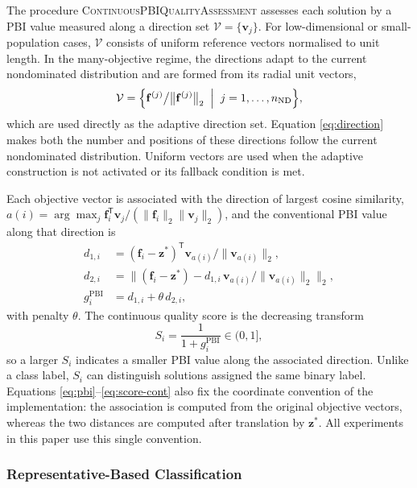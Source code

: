 \documentclass[final,5p,times,twocolumn]{elsarticle}
\newcommand{\vf}{\mathbf{f}}
\newcommand{\vv}{\mathbf{v}}
\newcommand{\vz}{\mathbf{z}}
\begin{document}
The procedure \textsc{ContinuousPBIQualityAssessment} assesses each solution
by a PBI value measured along a
direction set $\mathcal{V}=\{\vv_j\}$. For low-dimensional or small-population
cases, $\mathcal{V}$ consists of uniform reference vectors normalised to unit
length. In the many-objective regime, the directions adapt to the current
nondominated distribution and are formed from its radial unit vectors,
\begin{equation}
\mathcal{V}=\Bigl\{\vf^{(j)}\big/\bigl\|\vf^{(j)}\bigr\|_2
\;\Bigm|\;j=1,\ldots,n_{\mathrm{ND}}\Bigr\},
\label{eq:direction}
\end{equation}
which are used directly as the adaptive direction set. Equation
\eqref{eq:direction} makes both the number and positions of these directions
follow the current nondominated distribution. Uniform vectors are used when the
adaptive construction is not activated or its fallback condition is met.

Each objective vector is associated with the direction of largest cosine
similarity, $a(i)=\arg\max_j
\vf_i^{\mathsf T}\vv_j/(\|\vf_i\|_2\|\vv_j\|_2)$, and the conventional
PBI value~\cite{ref:moead} along that direction is
\begin{equation}
\begin{aligned}
d_{1,i}&=(\vf_i-\vz^{*})^{\mathsf T}\vv_{a(i)}\big/\|\vv_{a(i)}\|_2,\\
d_{2,i}&=\bigl\|(\vf_i-\vz^{*})
        -d_{1,i}\,\vv_{a(i)}/\|\vv_{a(i)}\|_2\bigr\|_2,\\
g_i^{\mathrm{PBI}}&=d_{1,i}+\theta\,d_{2,i},
\end{aligned}
\label{eq:pbi}
\end{equation}
with penalty $\theta$. The continuous quality score is the decreasing transform
\begin{equation}
S_i=\frac{1}{1+g_i^{\mathrm{PBI}}}\in(0,1],
\label{eq:score-cont}
\end{equation}
so a larger $S_i$ indicates a smaller PBI value along the associated direction.
Unlike a class label, $S_i$ can distinguish solutions assigned the same binary
label.
Equations \eqref{eq:pbi}--\eqref{eq:score-cont} also fix the coordinate
convention of the implementation: the association is computed from the original
objective vectors, whereas the two distances are computed after translation by
$\vz^{*}$. All experiments in this paper use this single convention.

\subsubsection{Representative-Based Classification}
\label{sec:method:paqc:coarse}
\end{document}

